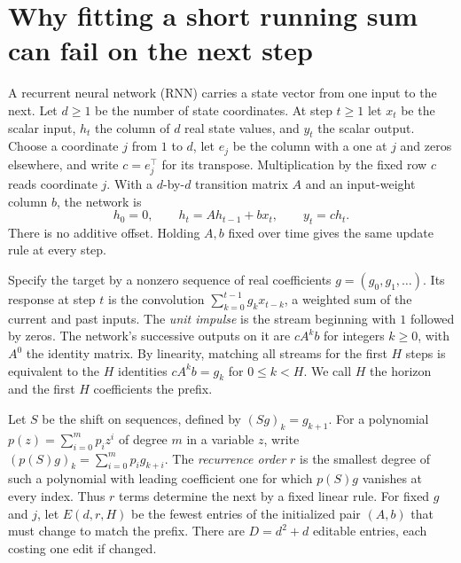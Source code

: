 \section{Why fitting a short running sum can fail on the next step}\label{sec:front}
A recurrent neural network (RNN) carries a state vector from one input to the next. Let $d\ge1$ be the number of state coordinates. At step $t\ge1$ let $x_t$ be the scalar input, $h_t$ the column of $d$ real state values, and $y_t$ the scalar output. Choose a coordinate $j$ from $1$ to $d$, let $e_j$ be the column with a one at $j$ and zeros elsewhere, and write $c=e_j^\top$ for its transpose. Multiplication by the fixed row $c$ reads coordinate $j$. With a $d$-by-$d$ transition matrix $A$ and an input-weight column $b$, the network is
\[
             h_0=0,\qquad h_t=Ah_{t-1}+b x_t,\qquad y_t=c h_t .
\]
There is no additive offset. Holding $A,b$ fixed over time gives the same update rule at every step.

Specify the target by a nonzero sequence of real coefficients $g=(g_0,g_1,\ldots)$. Its response at step $t$ is the convolution $\sum_{k=0}^{t-1}g_k x_{t-k}$, a weighted sum of the current and past inputs. The \emph{unit impulse} is the stream beginning with $1$ followed by zeros. The network's successive outputs on it are $cA^kb$ for integers $k\ge0$, with $A^0$ the identity matrix. By linearity, matching all streams for the first $H$ steps is equivalent to the $H$ identities $cA^kb=g_k$ for $0\le k<H$. We call $H$ the horizon and the first $H$ coefficients the prefix.

Let $S$ be the shift on sequences, defined by $(Sg)_k=g_{k+1}$. For a polynomial $p(z)=\sum_{i=0}^m p_i z^i$ of degree $m$ in a variable $z$, write $(p(S)g)_k=\sum_{i=0}^m p_i g_{k+i}$. The \emph{recurrence order} $r$ is the smallest degree of such a polynomial with leading coefficient one for which $p(S)g$ vanishes at every index. Thus $r$ terms determine the next by a fixed linear rule. For fixed $g$ and $j$, let $E(d,r,H)$ be the fewest entries of the initialized pair $(A,b)$ that must change to match the prefix. There are $D=d^2+d$ editable entries, each costing one edit if changed.


